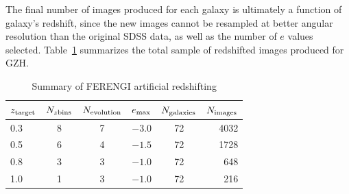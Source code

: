 \documentclass[twocolumn]{aastex6}
\begin{document}
The final number of \ferengi{} images produced for each galaxy is ultimately a function of galaxy's redshift, since the new images cannot be resampled at better angular resolution than the original SDSS data, as well as the number of $e$ values selected. Table~\ref{tbl:ferengivalues} summarizes the total sample of redshifted images produced for GZH. 

\begin{table}
\caption{Summary of FERENGI artificial redshifting \label{tbl:ferengivalues}}
\begin{tabular}{lccccr}
\hline\hline
$z_{\rm target}$ & $N_{z {\rm bins}}$ & $N_{\rm evolution}$ & $e_{\rm max}$ & $N_{\rm galaxies}$ & $N_{\rm images}$\\
\hline
0.3              & 8                  & 7                   & $-3.0$        & 72             & 4032 \\
0.5              & 6                  & 4                   & $-1.5$        & 72             & 1728 \\
0.8              & 3                  & 3                   & $-1.0$        & 72             &  648 \\
1.0              & 1                  & 3                   & $-1.0$        & 72             &  216 \\
\hline\hline
\end{tabular}
\end{table}
\end{document}
